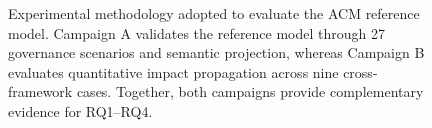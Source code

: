 \documentclass[10pt]{article}
\begin{document}
\begin{figure}[ht]
	
	\caption{Experimental methodology adopted to evaluate the ACM reference model. Campaign A validates the reference model through 27 governance scenarios and semantic projection, whereas Campaign B evaluates quantitative impact propagation across nine cross-framework cases. Together, both campaigns provide complementary evidence for RQ1--RQ4.}
	
	\label{fig:evaluation_methodology}
	
\end{figure}
\end{document}
